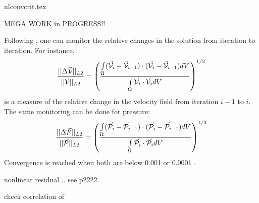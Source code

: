\begin{flushright} {\tiny {\color{gray} nlconvcrit.tex}} \end{flushright}

MEGA WORK in PROGRESS!!

Following \cite{spmw16}, one can monitor the relative changes in the solution from iteration to iteration. 
For instance, 
\[
\frac{||\Delta \vec{\cal V} ||_{L2}}{||\vec{\cal V}||_{L2}} 
=
\left( \frac{\int\limits_\Omega (\vec{\cal V}_i-\vec{\cal V}_{i-1}) \cdot( \vec{\cal V}_i-\vec{\cal V}_{i-1}) dV}{\int\limits_\Omega \vec{\cal V}_i\cdot\vec{\cal V}_i dV} \right)^{1/2}
\]
is a measure of the relative change in the velocity field from iteration $i-1$ to $i$. 
The same monitoring can be done for pressure:
\[
\frac{||\Delta \vec{\cal P} ||_{L2}}{||\vec{\cal P}||_{L2}} 
=
\left( \frac{\int\limits_\Omega (\vec{\cal P}_i-\vec{\cal P}_{i-1}) \cdot( \vec{\cal P}_i-\vec{\cal P}_{i-1}) dV}{\int\limits_\Omega \vec{\cal P}_i\cdot\vec{\cal P}_i dV} \right)^{1/2}
\]
Convergence is reached when both are below 0.001 \cite{lemm08} or 0.0001 \cite{kaus10}.




nonlinear residual .. see \cite{spmw16} p2222. 

check correlation of \cite{thie11}



